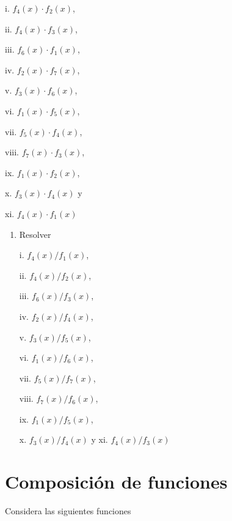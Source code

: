 \documentclass[]{book}
\providecommand{\tightlist}{%
  \setlength{\itemsep}{0pt}\setlength{\parskip}{0pt}}
\begin{document}
\begin{multicols}{2}

    i. $f_4(x)\cdot f_2(x)$, 
    
    ii. $f_4(x)\cdot f_3(x)$,
    
    iii. $f_6(x)\cdot f_1(x)$, 
    
    iv. $f_2(x)\cdot f_7(x)$, 
    
    v. $f_3(x)\cdot f_6(x)$, 
    
    vi. $f_1(x)\cdot f_5(x)$, 
    
    vii. $f_5(x)\cdot f_4(x)$, 
    
    viii. $f_7(x)\cdot f_3(x)$, 
    
    ix. $f_1(x)\cdot f_2(x)$,
    
    x. $f_3(x)\cdot f_4(x)$ y 
    
    xi. $f_4(x)\cdot f_1(x)$
\end{multicols}

\begin{enumerate}
\def\labelenumi{\alph{enumi}.}
\setcounter{enumi}{2}
\tightlist
\item
  Resolver

  \begin{multicols}{2}

  i. $f_4(x)/f_1(x)$,

  ii. $f_4(x)/ f_2(x)$, 

  iii. $f_6(x)/f_3(x)$, 

  iv. $f_2(x)/f_4(x)$,

  v. $f_3(x)/f_5(x)$,

  vi. $f_1(x)/f_6(x)$, 

  vii. $f_5(x)/f_7(x)$, 

  viii. $f_7(x)/f_6(x)$,

  ix. $f_1(x)/f_5(x)$,

  x. $f_3(x)/f_4(x)$ y 
  xi. $f_4(x)/f_3(x)$
  \end{multicols}
\end{enumerate}

\section{Composición de funciones}\label{composiciuxf3n-de-funciones}

Considera las siguientes funciones
\end{document}
